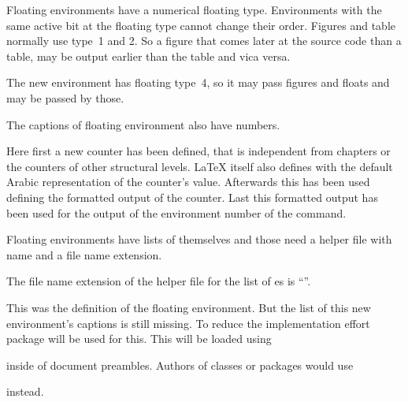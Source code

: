 Floating environments have a numerical floating
type. Environments with the same active bit at the floating type cannot change
their order. Figures and table normally use type~1 and 2. So a figure that
comes later at the source code than a table, may be output earlier than the
table and vica versa.
\begin{lstcode}[belowskip=\dp\strutbox plus 1pt]
  \newcommand*{\ftype@remarkbox}{4}
\end{lstcode}
The new environment has floating type~4, so it may pass figures and floats and
may be passed by those.

The captions of floating environment also have numbers.
\begin{lstcode}[belowskip=\dp\strutbox plus 1pt]
  \newcommand*{\remarkboxformat}{%
    Remark~\theremarkbox\csname autodot\endcsname}
  \newcommand*{\fnum@remarkbox}{\remarkboxformat}
\end{lstcode}
Here first a new counter has been defined, that is independent from chapters
or the counters of other structural levels. \LaTeX{} itself also defines
 with the default Arabic representation of the counter's
value. Afterwards this has been used defining the formatted output of the
counter. Last this formatted output has been used for the output of the
environment number of the  command.

Floating environments have lists of themselves
and those need a helper file with name  and a file name
extension.
\begin{lstcode}[belowskip=\dp\strutbox plus 1pt]
  \newcommand*{\ext@remarkbox}{lor}
\end{lstcode}
The file name extension of the helper file for the list of
es is ``''.

This was the definition of the floating environment. But the list of this new
environment's captions is still missing. To reduce the implementation effort
package  will be used for this. This will be loaded using
\begin{lstcode}[belowskip=\dp\strutbox plus 1pt]
  \usepackage{tocbasic}
\end{lstcode}
inside of document preambles. Authors of classes or packages would use
\begin{lstcode}[belowskip=\dp\strutbox plus 1pt]
  \RequirePackage{tocbasic}
\end{lstcode}
instead.

